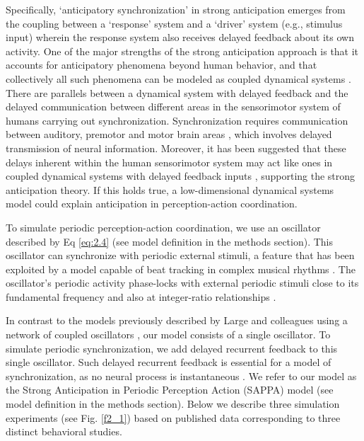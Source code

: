 \documentclass{report}
\begin{document}
Specifically, `anticipatory synchronization' in strong anticipation emerges from the coupling between a `response' system and a `driver' system (e.g., stimulus input) wherein the response system also receives delayed feedback about its own activity. One of the major strengths of the strong anticipation approach is that it accounts for anticipatory phenomena beyond human behavior, and that collectively all such phenomena can be modeled as coupled dynamical systems \cite{stepp2010strong, washburn2015harmony, kelso1995dynamic}. There are parallels between a dynamical system with delayed feedback and the delayed communication between different areas in the sensorimotor system of humans carrying out synchronization. Synchronization requires communication between auditory, premotor and motor brain areas \cite{merchant2015finding, banerjee2007neural, slowinski2016effects}, which involves delayed transmission of neural information. Moreover, it has been suggested that these delays inherent within the human sensorimotor system may act like ones in coupled dynamical systems with delayed feedback inputs \cite{washburn2015harmony, banerjee2007neural, slowinski2016effects}, supporting the strong anticipation theory. If this holds true, a low-dimensional dynamical systems model could explain anticipation in perception-action coordination.

To simulate periodic perception-action coordination, we use an oscillator described by Eq \eqref{eq:2.4} (see model definition in the methods section). This oscillator can synchronize with periodic external stimuli, a feature that has been exploited by a model capable of beat tracking in complex musical rhythms \cite{large2015neural, velasco2011pulse}. The oscillator's periodic activity phase-locks with external periodic stimuli close to its fundamental frequency and also at integer-ratio relationships \cite{large2010canonical}.

In contrast to the models previously described by Large and colleagues using a network of coupled oscillators \cite{large2015neural, velasco2011pulse, large2010canonical}, our model consists of a single oscillator. To simulate periodic synchronization, we add delayed recurrent feedback to this single oscillator. Such delayed recurrent feedback is essential for a model of synchronization, as no neural process is instantaneous \cite{banerjee2007neural}. We refer to our model as the Strong Anticipation in Periodic Perception Action (SAPPA) model (see model definition in the methods section). Below we describe three simulation experiments (see Fig.{} \ref{f2_1}) based on published data corresponding to three distinct behavioral studies.
\end{document}
